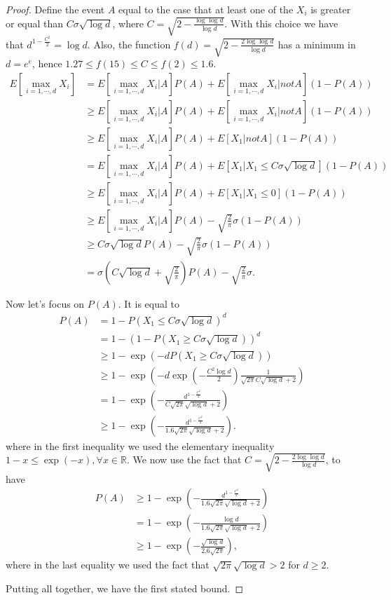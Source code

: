 \documentclass{article}
\newcommand{\field}[1]{\mathbb{#1}}
\newcommand{\R}{\field{R}}
\begin{document}
\begin{proof}

Define the event $A$ equal to the case that at least one of the $X_i$ is greater or equal than $C \sigma \sqrt{\log d}$, where $C=\sqrt{2-\frac{\log \log d}{\log d}}$. With this choice we have that $d^{1-\frac{C^2}{2}}=\log d$. Also, the function $f(d)=\sqrt{2-\frac{2\log \log d}{\log d}}$ has a minimum in $d=e^e$, hence $1.27 \leq f(15) \leq C\leq f(2)\leq 1.6$.
%
\begin{align*}
E[\max_{i=1,\cdots,d} X_i]
&= E[\max_{i=1,\cdots,d} X_i| A ] P(A) + E[\max_{i=1,\cdots,d} X_i| not A ] (1-P(A)) \\
&\geq E[\max_{i=1,\cdots,d} X_i| A ] P(A) + E[\max_{i=1,\cdots,d} X_i| not A ] (1-P(A))\\
&\geq E[\max_{i=1,\cdots,d} X_i| A ] P(A) + E[X_1| not A ](1-P(A)) \\
&= E[\max_{i=1,\cdots,d} X_i| A ] P(A) + E[X_1| X_1\leq C \sigma \sqrt{\log d}] (1-P(A))\\
&\geq E[\max_{i=1,\cdots,d} X_i| A ] P(A) + E[X_1| X_1\leq 0](1-P(A)) \\
&\geq E[\max_{i=1,\cdots,d} X_i| A ] P(A) - \sqrt{\frac{2}{\pi}} \sigma (1-P(A))\\
&\geq C \sigma \sqrt{\log d} P(A) - \sqrt{\frac{2}{\pi}} \sigma (1-P(A))\\
&= \sigma \left(C\sqrt{\log d} +\sqrt{\frac{2}{\pi}}\right)P(A) -  \sqrt{\frac{2}{\pi}} \sigma.
\end{align*}

Now let's focus on $P(A)$. It is equal to
\begin{align*}
P(A)
&= 1-P(X_1\leq C \sigma \sqrt{\log d})^d \\
&= 1-(1-P(X_1\geq C \sigma \sqrt{\log d}))^d \\
&\geq 1-\exp\left(-d P(X_1\geq C \sigma \sqrt{\log d})\right) \\
&\geq 1 - \exp\left(-d \exp\left(-\frac{C^2 \log d}{2}\right) \frac{1}{\sqrt{2\pi}C \sqrt{\log d}+2} \right) \\
&= 1 - \exp\left(-\frac{d^{1-\frac{C^2}{2}}}{C \sqrt{2\pi} \sqrt{\log d}+2}\right) \\
&\geq 1 - \exp\left(-\frac{d^{1-\frac{C^2}{2}}}{1.6 \sqrt{2\pi} \sqrt{\log d}+2}\right).
\end{align*}
where in the first inequality we used the elementary inequality $1-x \leq \exp(-x), \forall x \in \R$.
We now use the fact that $C=\sqrt{2- \frac{2 \log \log d}{\log d}}$, to have
\begin{align*}
P(A)
& \geq 1 - \exp\left(-\frac{d^{1-\frac{C^2}{2}}}{1.6 \sqrt{2\pi} \sqrt{\log d}+2}\right) \\
& = 1 - \exp\left(-\frac{\log d}{1.6 \sqrt{2\pi} \sqrt{\log d}+2}\right) \\
& \geq 1 - \exp\left(-\frac{\sqrt{\log d}}{2.6 \sqrt{2\pi}}\right),
\end{align*}
where in the last equality we used the fact that $\sqrt{2\pi} \sqrt{\log d} > 2$ for $d\geq 2$.

Putting all together, we have the first stated bound.
\end{proof}
\end{document}
